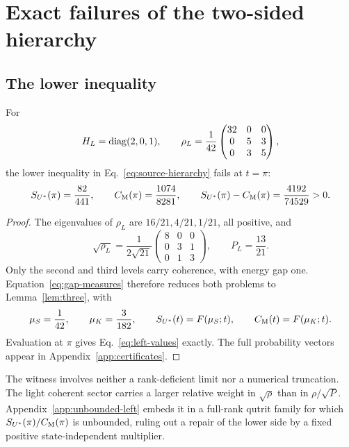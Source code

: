 \section{Exact failures of the two-sided hierarchy}\label{sec:hierarchy}
\subsection{The lower inequality}
\begin{proposition}\label{prop:left}
For
\begin{equation}\label{eq:left-state}
 H_L=\operatorname{diag}(2,0,1),\qquad
 \rho_L=\frac1{42}\begin{pmatrix}32&0&0\\0&5&3\\0&3&5\end{pmatrix},
\end{equation}
the lower inequality in Eq.~\eqref{eq:source-hierarchy} fails at $t=\pi$:
\begin{equation}\label{eq:left-values}
 S_{U^*}(\pi)=\frac{82}{441},\qquad
 C_{\mathrm M}(\pi)=\frac{1074}{8281},\qquad
 S_{U^*}(\pi)-C_{\mathrm M}(\pi)=\frac{4192}{74529}>0.
\end{equation}
\end{proposition}
\begin{proof}
The eigenvalues of $\rho_L$ are $16/21,4/21,1/21$, all positive, and
\begin{equation}\label{eq:left-root}
 \sqrt{\rho_L}=\frac1{2\sqrt{21}}
 \begin{pmatrix}8&0&0\\0&3&1\\0&1&3\end{pmatrix},
 \qquad P_L=\frac{13}{21}.
\end{equation}
Only the second and third levels carry coherence, with energy gap one.
Equation~\eqref{eq:gap-measures} therefore reduces both problems to
Lemma~\ref{lem:three}, with
\begin{equation}\label{eq:left-weights}
 \mu_S=\frac1{42},\qquad \mu_K=\frac3{182},\qquad
 S_{U^*}(t)=F(\mu_S;t),\qquad C_{\mathrm M}(t)=F(\mu_K;t).
\end{equation}
Evaluation at $\pi$ gives Eq.~\eqref{eq:left-values} exactly. The full
probability vectors appear in Appendix~\ref{app:certificates}.
\end{proof}

The witness involves neither a rank-deficient limit nor a numerical
truncation. The light coherent sector carries a larger relative weight in
$\sqrt\rho$ than in $\rho/\sqrt P$. Appendix~\ref{app:unbounded-left}
embeds it in a full-rank qutrit family for which $S_{U^*}(\pi)/C_{\mathrm M}(\pi)$ is
unbounded, ruling out a repair of the lower side by a fixed positive
state-independent multiplier.

